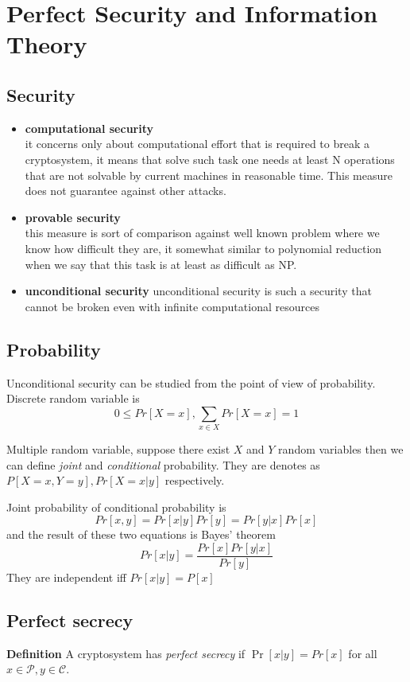 \documentclass[a4paper,10pt]{article}
\begin{document}
\section*{Perfect Security and Information Theory}
\subsection*{Security}
\begin{itemize}
\item \textbf{computational security}\\ it concerns only about computational effort that is required to break a cryptosystem, it means that solve such task one needs at least N operations that are not solvable by current machines in reasonable time. This measure does not guarantee against other attacks.
\item \textbf{provable security}\\
this measure is sort of comparison against well known problem where we know how difficult they are, it somewhat similar to polynomial reduction when we say that this task is at least as difficult as NP.
\item \textbf{unconditional security}
unconditional security is such a security that cannot be broken even with infinite computational resources
\end{itemize}
\subsection*{Probability}
Unconditional security can be studied from the point of view of probability.
Discrete random variable is
$$
0 \leq Pr[X=x], \sum_{x \in X} Pr[X=x] = 1
$$

Multiple random variable, suppose there exist $X$ and $Y$ random variables then we can define \textit{joint} and \textit{conditional} probability. They are denotes as $P[X=x,Y=y],Pr[X=x|y]$ respectively.

Joint probability of conditional probability is 
$$
Pr[x,y] = Pr[x|y]Pr[y] = Pr[y|x]Pr[x]
$$
and the result of these two equations is Bayes' theorem
$$
Pr[x|y] = \frac{Pr[x]Pr[y|x]}{Pr[y]}
$$
They are independent iff $Pr[x|y]=P[x]$
\subsection*{Perfect secrecy}
\textbf{Definition} A cryptosystem has \textit{perfect secrecy} if $\Pr[x|y] = Pr[x]$ for all $x \in \mathcal{P}, y \in \mathcal{C}$.
\end{document}
